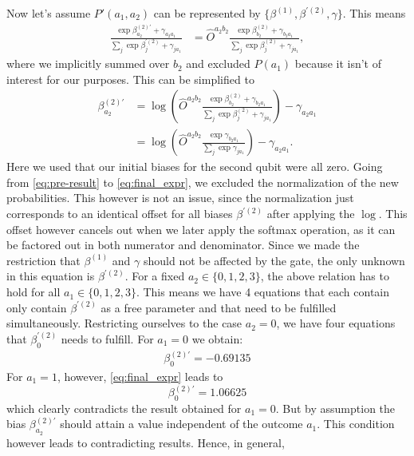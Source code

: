\documentclass[a4]{article}
\begin{document}
Now let's assume $P'(a_1,a_2)$ can be represented by $\{ \beta^{(1)},
\beta^{'(2)}, \gamma \}$. This means
\begin{align}
    \frac{\exp{\beta^{(2)'}_{a_2} + \gamma_{a_2a_1}}}{\sum_j
    \exp{\beta^{'(2)}_{j} + \gamma_{ja_1}}} &=
    \hat{O}^{a_2 b_2} \frac{\exp{\beta^{(2)}_{b_2} +
    \gamma_{b_2a_1}}}{\sum_j \exp{\beta^{(2)}_{j} + \gamma_{ja_1}}},
    \label{eq:pre-result}
\end{align}
where we implicitly summed over $b_2$ and excluded $P(a_1)$ because it isn't of
 interest for our purposes. This can be simplified to
\begin{align}
    \beta^{(2)'}_{a_2}  &=  \log{\left( \hat{O}^{a_2 b_2}
     \frac{\exp{\beta^{(2)}_{b_2} + \gamma_{b_2a_1}}}{\sum_j
     \exp{\beta^{(2)}_{j} + \gamma_{ja_1}}} \right)} - \gamma_{a_2a_1} \\
    &= \log{\left( \hat{O}^{a_2 b_2} \frac{\exp{ \gamma_{b_2a_1}}}{\sum_j
    \exp{ \gamma_{ja_1}}} \right)} - \gamma_{a_2a_1}.
    \label{eq:final_expr}
\end{align}
Here we used that our initial biases for the second qubit were all zero. Going
from \ref{eq:pre-result} to \ref{eq:final_expr}, we excluded the normalization
of the new probabilities. This however is not an issue, since the normalization
just corresponds to an identical offset for all biases  $\beta^{'(2)}$ after applying the $\log$. This offset however cancels out when we later apply the
softmax operation, as it can be factored out in both numerator and denominator. Since we made the restriction that $\beta^{(1)}$ and $\gamma$ should not be
affected by the gate, the only unknown in this equation is $\beta^{'(2)}$. For a fixed $a_2\in\{0,1,2,3\}$, the above relation has to hold for all $a_1\in\{0,1,2,3\}$. This means we have 4 equations that each contain only
contain $\beta^{'(2)}$ as a free parameter and that need to be fulfilled simultaneously. Restricting ourselves to the case $a_2=0$, we have four
equations that $\beta^{'(2)}_0$ needs to fulfill. For $a_1 = 0$ we obtain:
\begin{align*}
    \beta^{(2)'}_0 = -0.69135
\end{align*}
For $a_1=1$, however, \ref{eq:final_expr} leads to
\begin{equation*}
    \beta^{(2)'}_0 = 1.06625
\end{equation*}
which clearly contradicts the result obtained for $a_1=0$. But by assumption
the bias $\beta^{(2)'}_{a_2}$ should attain a value independent of the outcome $a_1$. This condition however leads to contradicting results. Hence, in general,
\end{document}
